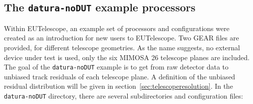 \subsection{The \texttt{datura-noDUT} example
processors}\label{sec:datura-nodut}

Within EUTelescope, an example set of processors and configurations were created
as an introduction for new users to EUTelescope. Two GEAR files are provided,
for different telescope geometries. As the name suggests, no external device
under test is used, only the six MIMOSA 26 telescope planes are included. The
goal of the \texttt{datura-noDUT} example is to get from raw detector data to
unbiased track residuals of each telescope plane. A definition of the unbiased
residual distribution will be given in section~\ref{sec:telescoperesolution}. In
the \texttt{datura-noDUT} directory, there are several subdirectories and
configuration files:\\


